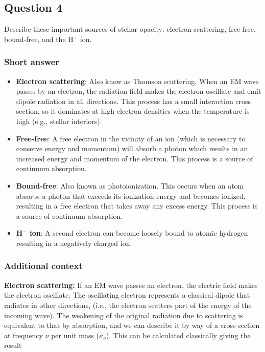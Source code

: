 \documentclass[a4paper,10pt]{article}
\begin{document}

\newpage
\subsection{Question 4}

Describe these important sources of stellar opacity: electron scattering, free-free, bound-free, and the H$^-$ ion.

\subsubsection{Short answer}

\begin{itemize}
    \item \textbf{Electron scattering}: Also know as Thomson scattering. When an EM wave passes by an electron, the radiation field makes the electron oscillate and emit dipole radiation in all directions. This process has a small interaction cross section, so it dominates at high electron densities when the temperature is high (e.g., stellar interiors).
    \item \textbf{Free-free}: A free electron in the vicinity of an ion (which is necessary to conserve energy and momentum) will absorb a photon which results in an increased energy and momentum of the electron. This process is a source of continuum absorption.
    \item \textbf{Bound-free}: Also known as photoionization. This occurs when an atom absorbs a photon that exceeds its ionization energy and becomes ionized, resulting in a free electron that takes away any excess energy. This process is a source of continuum absorption.
    \item \textbf{H$^-$ ion}: A second electron can become loosely bound to atomic hydrogen resulting in a negatively charged ion.
\end{itemize}

\subsubsection{Additional context}

{\noindent}\textbf{Electron scattering:} If an EM wave passes an electron, the electric field makes the electron oscillate. The oscillating electron represents a classical dipole that radiates in other directions, (i.e., the electron scatters part of the energy of the incoming wave). The weakening of the original radiation due to scattering is equivalent to that by absorption, and we can describe it by way of a cross section at frequency $\nu$ per unit mass ($\kappa_\nu$). This can be calculated classically giving the result
\end{document}

